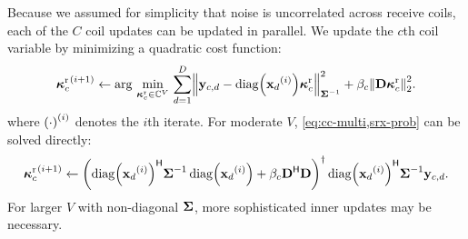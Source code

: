 Because we assumed for simplicity
that noise is uncorrelated across receive coils,
each of the $C$ coil updates
can be updated in parallel.
We update the $c$th coil variable
by minimizing a quadratic cost function:
\begin{align}
	\iter{\bmsrx_c}{i+1} \gets
		\argmin{\bmsrx_c\in\complexes{V}}
		\sum_{d=1}^D \norm{\bmy_{c,d}-\diag{\iter{\bmx_d}{i}}\bmsrx_c}^2_{\bmSig^{-1}}
		+ \beta_c \norm{\bmD\bmsrx_c}^2_2.
	\label{eq:cc-multi,srx-prob}
\end{align}
where $\iter{\paren{\cdot}}{i}$ 
denotes the $i$th iterate.
For moderate $V$,
\eqref{eq:cc-multi,srx-prob} can be solved directly:
\begin{align}
	\iter{\bmsrx_c}{i+1} \gets \pinv{%
		\diag{\iter{\bmx_d}{i}}\ctpose \bmSig^{-1} \diag{\iter{\bmx_d}{i}}
		+ \beta_c \bmD\ctpose \bmD
	}%
	\diag{\iter{\bmx_d}{i}}\ctpose \bmSig^{-1} \bmy_{c,d}.
	\label{eq:cc-multi,srx-update}
\end{align}
For larger $V$ with non-diagonal $\boldsymbol{\Sigma}$,
more sophisticated inner updates may be necessary.

